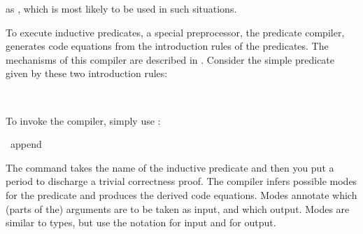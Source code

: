 \begin{isabellebody}
\begin{isamarkuptext}
   as \hyperlink{command.code-abort}{\mbox{}}, which is most
  likely to be used in such situations.%
\end{isamarkuptext}%
\isamarkuptrue%
%
\isamarkuptrue%
%
\begin{isamarkuptext}%
To execute inductive predicates, a special preprocessor, the predicate
 compiler, generates code equations from the introduction rules of the predicates.
The mechanisms of this compiler are described in \cite{Berghofer-Bulwahn-Haftmann:2009:TPHOL}.
Consider the simple predicate  given by these two
introduction rules:%
\end{isamarkuptext}%
\isamarkuptrue%
%
\isadelimquote
%
\endisadelimquote
%
\isatagquote
%
\begin{isamarkuptext}%
\\
\noindent{}%
\end{isamarkuptext}%
\isamarkuptrue%
%
\endisatagquote
{\isafoldquote}%
%
\isadelimquote
%
\endisadelimquote
%
\begin{isamarkuptext}%
\noindent To invoke the compiler, simply use \hypertarget{command.code-pred}{\hyperlink{command.code-pred}{\mbox{}}}:%
\end{isamarkuptext}%
\isamarkuptrue%
%
\isadelimquote
%
\endisadelimquote
%
\isatagquote
{}\isamarkupfalse%
\ append\ \isacommand{{\isachardot}}\isamarkupfalse%
%
\endisatagquote
{\isafoldquote}%
%
\isadelimquote
%
\endisadelimquote
%
\begin{isamarkuptext}%
\noindent The \hyperlink{command.code-pred}{\mbox{}} command takes the name
of the inductive predicate and then you put a period to discharge
a trivial correctness proof. 
The compiler infers possible modes 
for the predicate and produces the derived code equations.
Modes annotate which (parts of the) arguments are to be taken as input,
and which output. Modes are similar to types, but use the notation 
for input and  for output.
 

\end{isamarkuptext}
\end{isabellebody}
